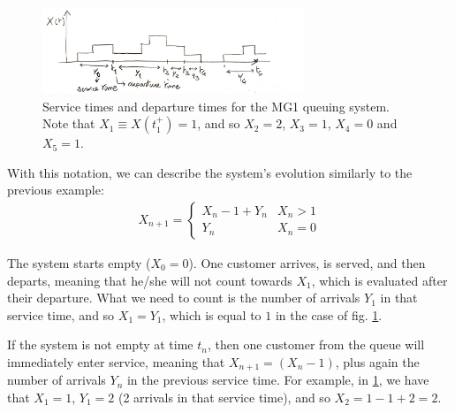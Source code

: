 \documentclass[../template.tex]{subfiles}
\begin{document}
\begin{figure}[htp]
    \centering
    \includegraphics[width=0.7\textwidth]{MG1-graph2.jpeg}
    \caption{Service times and departure times for the MG1 queuing system. Note that $X_1 \equiv X(t_1^+) = 1$, and so $X_2 = 2$, $X_3 = 1$, $X_4=0$ and $X_5 = 1$.\label{fig:queue-ev2}} 
\end{figure}

With this notation, we can describe the system's evolution similarly to the previous example:
\begin{align} \label{eqn:MG1-evo}
    X_{n+1} = \begin{cases}
        X_n - 1 + Y_n & X_n > 1\\
        Y_n & X_n = 0
    \end{cases}
\end{align}

The system starts empty ($X_0=0$). One customer arrives, is served, and then departs, meaning that he/she will not count towards $X_1$, which is evaluated after their departure. What we need to count is the number of arrivals $Y_1$ in that service time, and so $X_{1} = Y_1$, which is equal to $1$ in the case of fig. \ref{fig:queue-ev2}. 

\medskip

If the system is not empty at time $t_n$, then one customer from the queue will immediately enter service, meaning that $X_{n+1} = (X_n - 1)$, plus again the number of arrivals $Y_n$ in the previous service time. For example, in \ref{fig:queue-ev2}, we have that $X_1=1$, $Y_1 = 2$ (2 arrivals in that service time), and so $X_2 = 1 - 1 + 2 = 2$. 

\medskip
\end{document}
